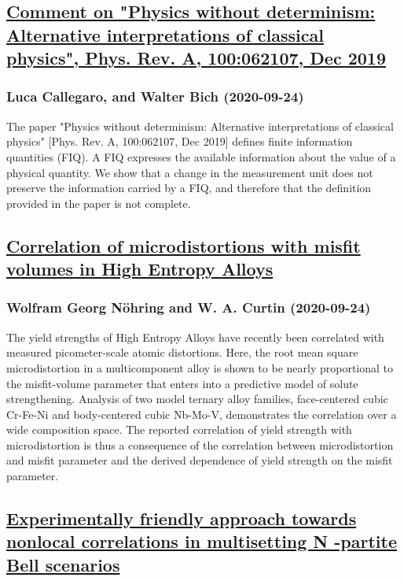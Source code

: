 \subsection*{\href{http://arxiv.org/abs/2009.11709v1}{Comment on "Physics without determinism: Alternative interpretations of  classical physics", Phys. Rev. A, 100:062107, Dec 2019}}
\subsubsection*{Luca Callegaro, and Walter Bich (2020-09-24)}
The paper "Physics without determinism: Alternative interpretations of
classical physics" [Phys. Rev. A, 100:062107, Dec 2019] defines finite
information quantities (FIQ). A FIQ expresses the available information about
the value of a physical quantity. We show that a change in the measurement unit
does not preserve the information carried by a FIQ, and therefore that the
definition provided in the paper is not complete.

\subsection*{\href{http://arxiv.org/abs/2009.11695v1}{Correlation of microdistortions with misfit volumes in High Entropy  Alloys}}
\subsubsection*{Wolfram Georg Nöhring and W. A. Curtin (2020-09-24)}
The yield strengths of High Entropy Alloys have recently been correlated with
measured picometer-scale atomic distortions. Here, the root mean square
microdistortion in a multicomponent alloy is shown to be nearly proportional to
the misfit-volume parameter that enters into a predictive model of solute
strengthening. Analysis of two model ternary alloy families, face-centered
cubic Cr-Fe-Ni and body-centered cubic Nb-Mo-V, demonstrates the correlation
over a wide composition space. The reported correlation of yield strength with
microdistortion is thus a consequence of the correlation between
microdistortion and misfit parameter and the derived dependence of yield
strength on the misfit parameter.

\subsection*{\href{http://arxiv.org/abs/2009.11691v1}{Experimentally friendly approach towards nonlocal correlations in  multisetting N -partite Bell scenarios}}
